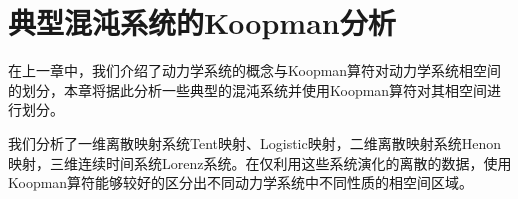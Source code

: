 \chapter{典型混沌系统的Koopman分析}
在上一章中，我们介绍了动力学系统的概念与Koopman算符对动力学系统相空间的划分，本章将据此分析一些典型的混沌系统并使用Koopman算符对其相空间进行划分。

我们分析了一维离散映射系统Tent映射、Logistic映射，二维离散映射系统Henon映射，三维连续时间系统Lorenz系统。在仅利用这些系统演化的离散的数据，使用Koopman算符能够较好的区分出不同动力学系统中不同性质的相空间区域。


\clearpage

\clearpage

\clearpage




% 
% 
